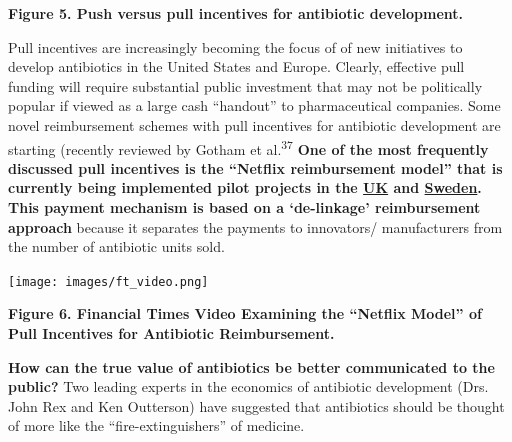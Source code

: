 \documentclass[
  11pt,
  paper=a4,
  ,captions=tableheading
]{scrartcl}
\begin{document}
\textbf{Figure 5. Push versus pull incentives for antibiotic
development.}

Pull incentives are increasingly becoming the focus of of new
initiatives to develop antibiotics in the United States and Europe.
Clearly, effective pull funding will require substantial public
investment that may not be politically popular if viewed as a large cash
``handout'' to pharmaceutical companies. Some novel reimbursement
schemes with pull incentives for antibiotic development are starting
(recently reviewed by Gotham et al.\textsuperscript{37} \textbf{One of
the most frequently discussed pull incentives is the ``Netflix
reimbursement model'' that is currently being implemented pilot projects
in the
\href{https://www.gov.uk/government/news/world-first-scheme-underway-to-tackle-amr-and-protect-uk-patients}{UK}
and
\href{https://www.folkhalsomyndigheten.se/the-public-health-agency-of-sweden/communicable-disease-control/antibiotics-and-antimicrobial-resistance/availability-of-antibiotics/}{Sweden}.
This payment mechanism is based on a `de-linkage' reimbursement
approach} because it separates the payments to innovators/ manufacturers
from the number of antibiotic units sold.

\texttt{[image: images/ft\_video.png]}

\textbf{Figure 6. Financial Times Video Examining the ``Netflix Model''
of Pull Incentives for Antibiotic Reimbursement.}

\textbf{How can the true value of antibiotics be better communicated to
the public?} Two leading experts in the economics of antibiotic
development (Drs. John Rex and Ken Outterson) have suggested that
antibiotics should be thought of more like the ``fire-extinguishers'' of
medicine.
\end{document}
